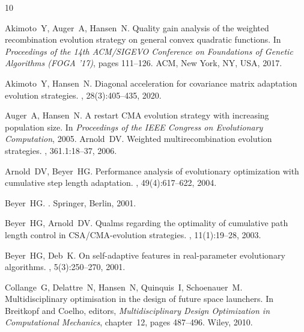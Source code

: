 \documentclass{article} %
\begin{document}
\begin{thebibliography}{10}


Akimoto~Y, Auger~A, Hansen~N.
\newblock Quality gain analysis of the weighted recombination evolution
  strategy on general convex quadratic functions.
\newblock In {\em Proceedings of the 14th ACM/SIGEVO Conference on Foundations
  of Genetic Algorithms ({FOGA} '17)}, pages 111--126. ACM, New York, NY, USA,
  2017.

Akimoto~Y, Hansen~N.
\newblock Diagonal acceleration for covariance matrix adaptation evolution
  strategies.
, 28(3):405--435, 2020.

Auger~A, Hansen~N.
\newblock A restart {CMA} evolution strategy with increasing population size.
\newblock In {\em Proceedings of the {IEEE} {C}ongress on {E}volutionary
  {C}omputation}, 2005.
Arnold~DV. 
\newblock Weighted multirecombination evolution strategies. 
, 361.1:18--37, 2006.

 Arnold~DV, Beyer~HG.
\newblock Performance analysis of evolutionary optimization with cumulative step length adaptation.
,
49(4):617--622, 2004.

Beyer~HG.
.
\newblock Springer, Berlin, 2001.

Beyer~HG, Arnold~DV.
\newblock Qualms regarding the optimality of cumulative path length control in
  {CSA}/{CMA}-evolution strategies.
, 11(1):19--28, 2003.

Beyer~HG, Deb~K.
\newblock On self-adaptive features in real-parameter evolutionary algorithms.
, 5(3):250--270,
  2001.

Collange~G, Delattre~N, Hansen~N, Quinquis~I, Schoenauer~M.
\newblock Multidisciplinary optimisation in the design of future space
  launchers.
\newblock In Breitkopf and Coelho, editors, {\em Multidisciplinary
  Design Optimization in Computational Mechanics}, chapter~12, pages 487--496.
  Wiley, 2010.


\end{thebibliography}
\end{document}
